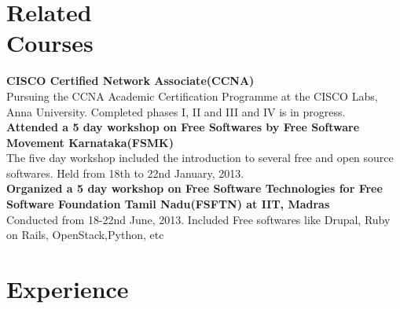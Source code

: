 \documentclass[margin,line]{resume}
\begin{document}
\begin{resume}
    \section{\mysidestyle Related\\Courses} 
    \textbf{CISCO Certified Network Associate(CCNA)} \\Pursuing the CCNA Academic Certification Programme at the CISCO Labs, Anna University. Completed phases I, II and III and IV is in progress. \vspace{2mm}\\\vspace{1mm}%
    \textbf{Attended a 5 day workshop on Free Softwares by Free Software Movement Karnataka(FSMK)}\\The five day workshop included the introduction to several free and open source softwares. Held from 18th to 22nd January, 2013.  \vspace{2mm}\vspace{1mm}%
    \\\textbf{Organized a 5 day workshop on Free Software Technologies for Free Software Foundation Tamil Nadu(FSFTN) at IIT, Madras}\\Conducted from 18-22nd June, 2013. Included Free softwares like Drupal, Ruby on Rails, OpenStack,Python, etc  \vspace{2mm}\vspace{1mm}%

    \section{\mysidestyle Experience}


\end{resume}
\end{document}
